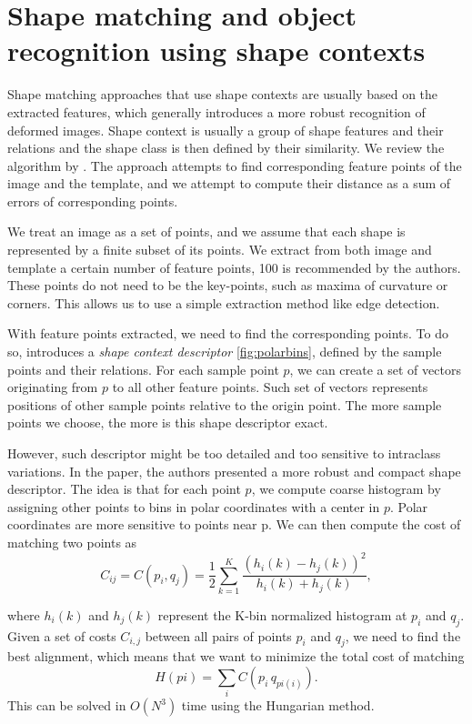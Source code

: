 \section{Shape matching and object recognition using shape contexts}
Shape matching approaches that use shape contexts are usually based on the extracted features, which generally introduces a more robust recognition of deformed images. Shape context is usually a group of shape features and their relations and the shape class is then defined by their similarity. We review the algorithm by \citet{simple}. The approach attempts to find corresponding feature points of the image and the template, and we attempt to compute their distance as a sum of errors of corresponding points. 

We treat an image as a set of points, and we assume that each shape is represented by a finite subset of its points. We extract from both image and template a certain number of feature points, 100 is recommended by the authors. These points do not need to be the key-points, such as maxima of curvature or corners. This allows us to use a simple extraction method like edge detection.

With feature points extracted, we need to find the corresponding points. To do so, \citet{simple} introduces a \emph{shape context descriptor} \ref{fig:polarbins}, defined by the sample points and their relations. For each sample point $p$, we can create a set of vectors originating from $p$ to all other feature points. Such set of vectors represents positions of other sample points relative to the origin point. The more sample points we choose, the more is this shape descriptor exact.

However, such descriptor might be too detailed and too sensitive to intraclass variations. In the paper, the authors presented a more robust and compact shape descriptor. The idea is that for each point $p$, we compute coarse histogram by assigning other points to bins in polar coordinates with a center in $p$. Polar coordinates are more sensitive to points near p. We can then compute the cost of matching two points as
\[ C_{ij} =  C(p_{i},q_{j}) = \frac{1}{2} \sum_{k=1}^{K} \frac{(h_{i}(k) - h_{j}(k))^2}{h_{i}(k) + h_{j}(k)}, \]

where $ h_{i}(k) $ and $ h_{j}(k) $ represent the K-bin normalized histogram at $p_{i}$ and $q_{j}$. Given a set of costs $C_{i,j}$ between all pairs of points $p_{i}$ and $q_{j}$, we need to find the best alignment, which means that we want to minimize the total cost of matching 
\[ H(pi) = \sum_{i} C(p_{i}\,q_{pi(i)}). \]
This can be solved in $O(N^3)$ time using the Hungarian method\cite{simple}. 

